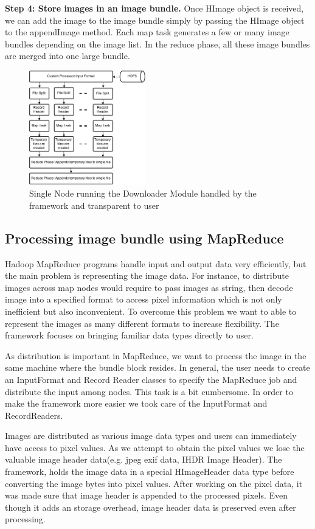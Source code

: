 \documentclass[conference]{IEEEtran}
\begin{document}
\textbf{ Step 4: Store images in an image bundle. } 
Once HImage object is received, we can add the image to the image bundle simply by passing the HImage object to the appendImage method. Each map task generates a few or many image bundles depending on the image list. In the reduce phase, all these image bundles are merged into one large bundle.

\begin{figure}[h]
	\centering
	\includegraphics[width=0.45\textwidth]{down-node}
	\caption{Single Node running the Downloader Module handled by the framework and transparent to user}
	\label{fig:down-node}
\end{figure}



\subsection{Processing image bundle using MapReduce}
Hadoop MapReduce programs handle input and output data very efficiently, but the main problem is representing the image data. For instance, to distribute images across map nodes would require to pass images as string, then decode image into a specified format to access pixel information which is not only inefficient but also inconvenient. To overcome this problem we want to able to represent the images as many different formats to increase flexibility. The framework focuses on bringing familiar data types directly to user.

As distribution is important in MapReduce, we want to process the image in the same machine where the bundle block resides. In general, the user needs to create an InputFormat and Record Reader classes to specify the MapReduce job and distribute the input among nodes. This task is a bit cumbersome. In order to make the framework more easier we took care of the InputFormat and RecordReaders.

Images are distributed as various image data types and users can immediately have access to pixel values. As we attempt to obtain the pixel values we lose the valuable image header data(e.g. jpeg exif data, IHDR\cite{David03} Image Header). The framework, holds the image data in a special HImageHeader data type before converting the image bytes into pixel values. After working on the pixel data, it was made sure that image header is appended to the processed pixels. Even though it adds an storage overhead, image header data is preserved even after processing.
\end{document}

